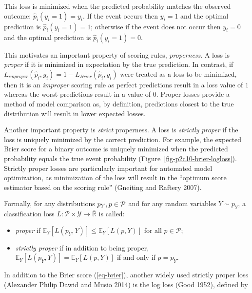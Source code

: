 \documentclass[
  letterpaper,
  krantz2]{style/krantz}
\providecommand{\tightlist}{%
  \setlength{\itemsep}{0pt}\setlength{\parskip}{0pt}}
\begin{document}
This loss is minimized when the predicted probability matches the
observed outcome: \(\hat{p}_i(y_i = 1) = y_i\). If the event occurs then
\(y_i = 1\) and the optimal prediction is \(\hat{p}_i(y_i = 1) = 1\);
otherwise if the event does not occur then \(y_i = 0\) and the optimal
prediction is \(\hat{p}_i(y_i = 1) = 0\).

This motivates an important property of scoring rules,
\emph{properness}. A loss is \emph{proper}
if it is minimized in expectation by the true prediction. In contrast,
if \(L_{improper}(\hat{p}_i, y_i) = 1 - L_{Brier}(\hat{p}_i, y_i)\) were
treated as a loss to be minimized, then it is an \emph{improper} scoring
rule as perfect predictions result in a loss value of \(1\) whereas the
worst predictions result in a value of \(0\). Proper losses provide a
method of model comparison as, by definition, predictions closest to the
true distribution will result in lower expected losses.

Another important property is \emph{strict}
properness. A loss is
\emph{strictly proper} if the loss is uniquely minimized by the correct
prediction. For example, the expected Brier score for a binary outcome
is uniquely minimized when the predicted probability equals the true
event probability (Figure~\ref{fig-p2c10-brier-logloss}). Strictly
proper losses are particularly important for automated model
optimization, as minimization of the loss will result in the ``optimum
score estimator based on the scoring rule'' (Gneiting and Raftery 2007).

Formally, for any distributions \(p_Y, p \in \cal P\) and for any random
variables \(Y \sim p_Y\), a classification loss
\(L: \mathcal{P}\times \mathcal{Y}\rightarrow \bar{\mathbb{R}}\) is
called:

\begin{itemize}
\tightlist
\item
  \emph{proper} if
  \(\mathbb{E}_Y[L(p_Y, Y)] \leq \mathbb{E}_Y[L(p, Y)]\) for all
  \(p \in \mathcal{P}\);
\item
  \emph{strictly proper} if in addition to being proper,
  \(\mathbb{E}_Y[L(p_Y, Y)] = \mathbb{E}_Y[L(p, Y)]\) if and only if
  \(p = p_Y\).
\end{itemize}

In addition to the Brier score (\ref{eq-brier}), another widely used
strictly proper loss (Alexander Philip Dawid and Musio 2014) is the log
loss (Good 1952), defined by
\end{document}
